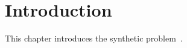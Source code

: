 \chapter{Introduction}\label{ch:intro}
This chapter introduces the synthetic problem~\cite{delta2019}.
